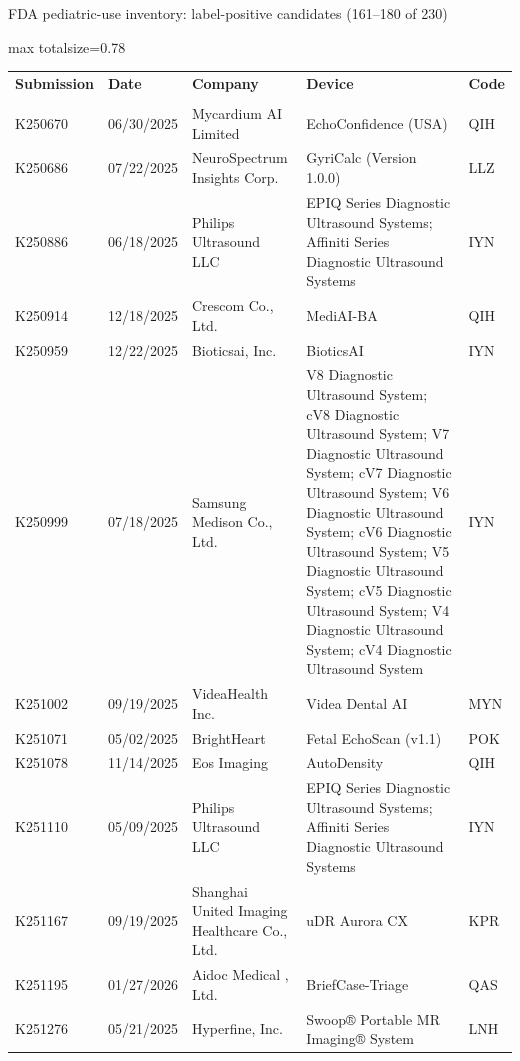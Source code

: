 \documentclass[aspectratio=169]{beamer}
\renewcommand{\arraystretch}{1.08}
\begin{document}
\begin{frame}[category=FDA appendix]{FDA pediatric-use inventory: label-positive candidates (161--180 of 230)}
\begin{adjustbox}{max totalsize={\textwidth}{0.78\textheight}}
\renewcommand{\arraystretch}{1.2}
\begin{tabular}{|p{}|p{}|p{}|p{}|p{}|}
\hline \textbf{Submission} & \textbf{Date} & \textbf{Company} & \textbf{Device} & \textbf{Code} \\\\ \hline
K250670 & 06/30/2025 & Mycardium AI Limited & EchoConfidence (USA) & QIH \\ \hline
K250686 & 07/22/2025 & NeuroSpectrum Insights Corp. & GyriCalc (Version 1.0.0) & LLZ \\ \hline
K250886 & 06/18/2025 & Philips Ultrasound LLC & EPIQ Series Diagnostic Ultrasound Systems; Affiniti Series Diagnostic Ultrasound Systems & IYN \\ \hline
K250914 & 12/18/2025 & Crescom Co., Ltd. & MediAI-BA & QIH \\ \hline
K250959 & 12/22/2025 & Bioticsai, Inc. & BioticsAI & IYN \\ \hline
K250999 & 07/18/2025 & Samsung Medison Co., Ltd. & V8 Diagnostic Ultrasound System; cV8 Diagnostic Ultrasound System; V7 Diagnostic Ultrasound System; cV7 Diagnostic Ultrasound System; V6 Diagnostic Ultrasound System; cV6 Diagnostic Ultrasound System; V5 Diagnostic Ultrasound System; cV5 Diagnostic Ultrasound System; V4 Diagnostic Ultrasound System; cV4 Diagnostic Ultrasound System & IYN \\ \hline
K251002 & 09/19/2025 & VideaHealth Inc. & Videa Dental AI & MYN \\ \hline
K251071 & 05/02/2025 & BrightHeart & Fetal EchoScan (v1.1) & POK \\ \hline
K251078 & 11/14/2025 & Eos Imaging & AutoDensity & QIH \\ \hline
K251110 & 05/09/2025 & Philips Ultrasound LLC & EPIQ Series Diagnostic Ultrasound Systems; Affiniti Series Diagnostic Ultrasound Systems & IYN \\ \hline
K251167 & 09/19/2025 & Shanghai United Imaging Healthcare Co., Ltd. & uDR Aurora CX & KPR \\ \hline
K251195 & 01/27/2026 & Aidoc Medical , Ltd. & BriefCase-Triage & QAS \\ \hline
K251276 & 05/21/2025 & Hyperfine, Inc. & Swoop® Portable MR Imaging® System & LNH \\ \hline

\end{tabular}
\end{adjustbox}
\end{frame}
\end{document}
